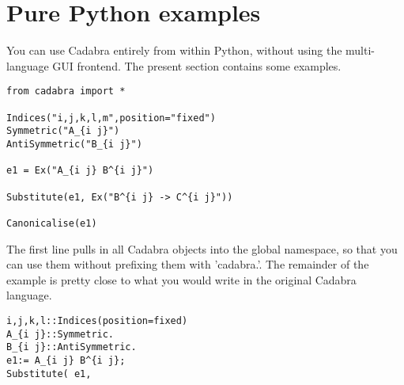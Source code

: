 
\section{Pure Python examples}

You can use Cadabra entirely from within Python, without using the
multi-language GUI frontend. The present section contains some
examples.

\begin{verbatim}
from cadabra import *

Indices("i,j,k,l,m",position="fixed")
Symmetric("A_{i j}")
AntiSymmetric("B_{i j}")

e1 = Ex("A_{i j} B^{i j}")

Substitute(e1, Ex("B^{i j} -> C^{i j}"))

Canonicalise(e1)
\end{verbatim}

The first line pulls in all Cadabra objects into the global namespace,
so that you can use them without prefixing them with 'cadabra.'. The
remainder of the example is pretty close to what you would write in
the original Cadabra language. 

\begin{verbatim}
i,j,k,l::Indices(position=fixed)
A_{i j}::Symmetric.
B_{i j}::AntiSymmetric.
e1:= A_{i j} B^{i j};
Substitute( e1, 
\end{verbatim}
